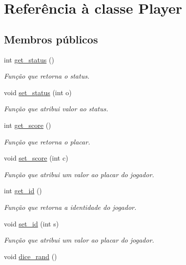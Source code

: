 \hypertarget{classPlayer}{}\section{Referência à classe Player}
\label{classPlayer}
\subsection*{Membros públicos}
\begin{DoxyCompactItemize}
\item 
int \hyperlink{classPlayer_ab217598d8d36d5dfc503a91856338647}{get\+\_\+status} ()
\begin{DoxyCompactList}\small\item\em Função que retorna o status. \end{DoxyCompactList}\item 
void \hyperlink{classPlayer_abf7dd2a22ed7f8f2221028c8aea36500}{set\+\_\+status} (int o)\hypertarget{classPlayer_abf7dd2a22ed7f8f2221028c8aea36500}{}\label{classPlayer_abf7dd2a22ed7f8f2221028c8aea36500}

\begin{DoxyCompactList}\small\item\em Função que atribui valor ao status. \end{DoxyCompactList}\item 
int \hyperlink{classPlayer_ad65c379a083e7c6656721616f8784059}{get\+\_\+score} ()
\begin{DoxyCompactList}\small\item\em Função que retorna o placar. \end{DoxyCompactList}\item 
void \hyperlink{classPlayer_abaddb087459b1d953f4f70ca0934fc06}{set\+\_\+score} (int c)
\begin{DoxyCompactList}\small\item\em Função que atribui um valor ao placar do jogador. \end{DoxyCompactList}\item 
int \hyperlink{classPlayer_af9425dfdf1386ec5f49264177caf9cc3}{get\+\_\+id} ()
\begin{DoxyCompactList}\small\item\em Função que retorna a identidade do jogador. \end{DoxyCompactList}\item 
void \hyperlink{classPlayer_a8fafe42050cd9c29e2667bf234812394}{set\+\_\+id} (int s)
\begin{DoxyCompactList}\small\item\em Função que atribui um valor ao placar do jogador. \end{DoxyCompactList}\item 
void \hyperlink{classPlayer_aa02c48406124e6e227bbb181479fd3e8}{dice\+\_\+rand} ()\hypertarget{classPlayer_aa02c48406124e6e227bbb181479fd3e8}{}\label{classPlayer_aa02c48406124e6e227bbb181479fd3e8}


\end{DoxyCompactItemize}
